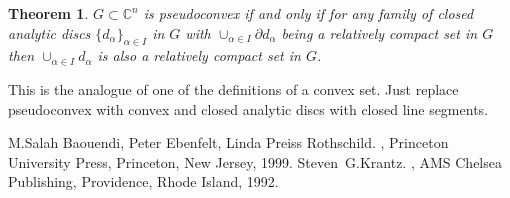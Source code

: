 \documentclass[12pt]{article}
\theoremstyle{theorem}
\newtheorem*{thm}{Theorem}
\theoremstyle{definition}
\theoremstyle{remark}
\begin{document}
\begin{thm}
$G \subset {\mathbb{C}}^n$ is pseudoconvex if and only if
for any family of closed analytic discs $\{ d_{\alpha} \}_{\alpha \in I}$
in $G$ with $\cup_{\alpha \in I} \partial d_\alpha$ being
a relatively compact set in $G$
then $\cup_{\alpha \in I} d_\alpha$ is also
a relatively compact set in $G$.
\end{thm}

This is the analogue of one of the definitions of a convex set. Just replace
pseudoconvex with convex and closed analytic discs with closed line segments.

\begin{thebibliography}{9}
M.\@ Salah Baouendi,
Peter Ebenfelt,
Linda Preiss Rothschild.
{\em {}},
Princeton University Press,
Princeton, New Jersey, 1999.
Steven~G.\@ Krantz.
{\em {}},
AMS Chelsea Publishing, Providence, Rhode Island, 1992.
\end{thebibliography}
\end{document}
